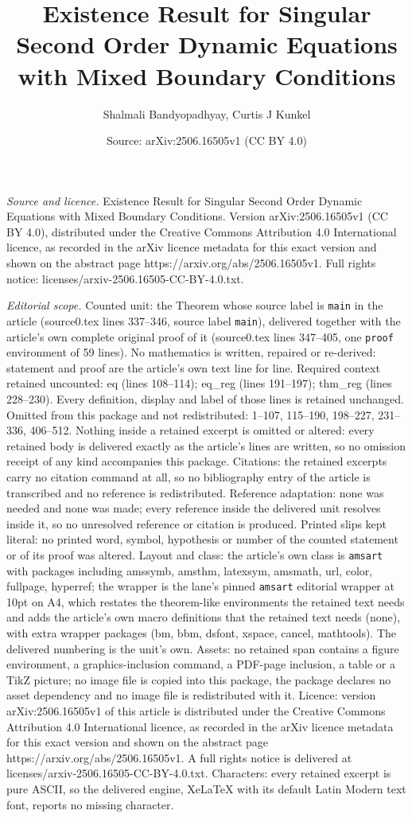 \documentclass[10pt,a4paper]{amsart}
\title[Existence Result for Singular Second Order Dynamic Equations]{Existence Result for Singular Second Order Dynamic Equations with Mixed Boundary Conditions}
\author{Shalmali Bandyopadhyay, Curtis J Kunkel}
\date{Source: arXiv:2506.16505v1 (CC BY 4.0)}
\begin{document}
\maketitle

\noindent\emph{Source and licence.} Existence Result for Singular Second Order Dynamic Equations with Mixed Boundary Conditions. Version arXiv:2506.16505v1 (CC BY 4.0), distributed under the Creative Commons Attribution 4.0 International licence, as recorded in the arXiv licence metadata for this exact version and shown on the abstract page https://arxiv.org/abs/2506.16505v1. Full rights notice: licenses/arxiv-2506.16505-CC-BY-4.0.txt.\par\smallskip

\noindent\textit{Editorial scope.} Counted unit: the Theorem whose source label is \texttt{main} in the article (source0.tex lines 337--346, source label \texttt{main}), delivered together with the article's own complete original proof of it (source0.tex lines 347--405, one \texttt{proof} environment of 59 lines). No mathematics is written, repaired or re-derived: statement and proof are the article's own text line for line. Required context retained uncounted: eq (lines 108--114); eq\_reg (lines 191--197); thm\_reg (lines 228--230). Every definition, display and label of those lines is retained unchanged. Omitted from this package and not redistributed: 1--107, 115--190, 198--227, 231--336, 406--512. Nothing inside a retained excerpt is omitted or altered: every retained body is delivered exactly as the article's lines are written, so no omission receipt of any kind accompanies this package. Citations: the retained excerpts carry no citation command at all, so no bibliography entry of the article is transcribed and no reference is redistributed. Reference adaptation: none was needed and none was made; every reference inside the delivered unit resolves inside it, so no unresolved reference or citation is produced. Printed slips kept literal: no printed word, symbol, hypothesis or number of the counted statement or of its proof was altered. Layout and class: the article's own class is \texttt{amsart} with packages including amssymb, amsthm, latexsym, amsmath, url, color, fullpage, hyperref; the wrapper is the lane's pinned \texttt{amsart} editorial wrapper at 10pt on A4, which restates the theorem-like environments the retained text needs and adds the article's own macro definitions that the retained text needs (none), with extra wrapper packages (bm, bbm, dsfont, xspace, cancel, mathtools). The delivered numbering is the unit's own. Assets: no retained span contains a figure environment, a graphics-inclusion command, a PDF-page inclusion, a table or a TikZ picture; no image file is copied into this package, the package declares no asset dependency and no image file is redistributed with it. Licence: version arXiv:2506.16505v1 of this article is distributed under the Creative Commons Attribution 4.0 International licence, as recorded in the arXiv licence metadata for this exact version and shown on the abstract page https://arxiv.org/abs/2506.16505v1. A full rights notice is delivered at licenses/arxiv-2506.16505-CC-BY-4.0.txt. Characters: every retained excerpt is pure ASCII, so the delivered engine, XeLaTeX with its default Latin Modern text font, reports no missing character.
\end{document}
